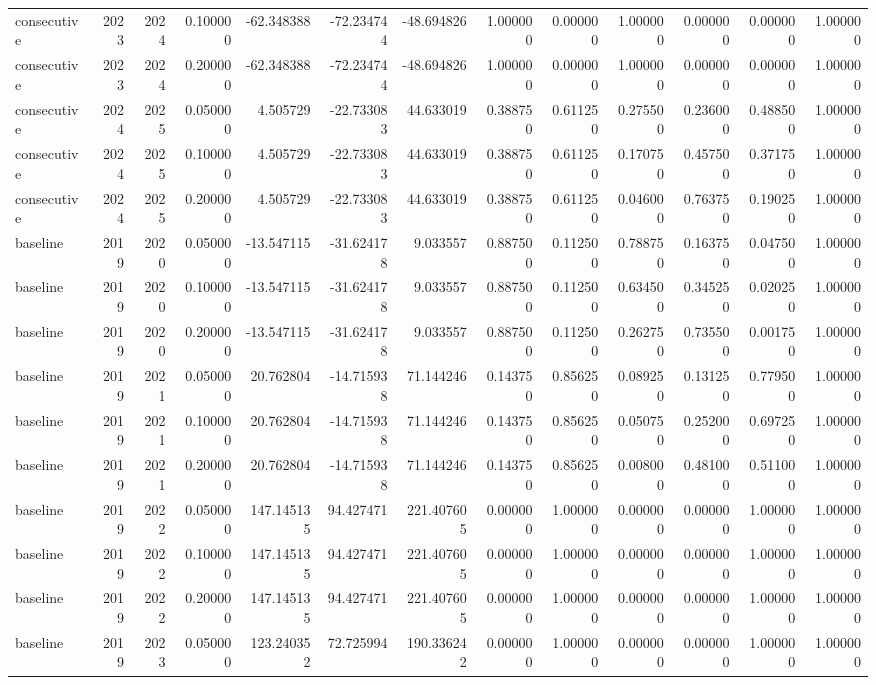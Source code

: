 \begin{tabular}{lrrrrrrrrrrrr}
consecutive & 2023 & 2024 & 0.100000 & -62.348388 & -72.234744 & -48.694826 & 1.000000 & 0.000000 & 1.000000 & 0.000000 & 0.000000 & 1.000000 \\
consecutive & 2023 & 2024 & 0.200000 & -62.348388 & -72.234744 & -48.694826 & 1.000000 & 0.000000 & 1.000000 & 0.000000 & 0.000000 & 1.000000 \\
consecutive & 2024 & 2025 & 0.050000 & 4.505729 & -22.733083 & 44.633019 & 0.388750 & 0.611250 & 0.275500 & 0.236000 & 0.488500 & 1.000000 \\
consecutive & 2024 & 2025 & 0.100000 & 4.505729 & -22.733083 & 44.633019 & 0.388750 & 0.611250 & 0.170750 & 0.457500 & 0.371750 & 1.000000 \\
consecutive & 2024 & 2025 & 0.200000 & 4.505729 & -22.733083 & 44.633019 & 0.388750 & 0.611250 & 0.046000 & 0.763750 & 0.190250 & 1.000000 \\
baseline & 2019 & 2020 & 0.050000 & -13.547115 & -31.624178 & 9.033557 & 0.887500 & 0.112500 & 0.788750 & 0.163750 & 0.047500 & 1.000000 \\
baseline & 2019 & 2020 & 0.100000 & -13.547115 & -31.624178 & 9.033557 & 0.887500 & 0.112500 & 0.634500 & 0.345250 & 0.020250 & 1.000000 \\
baseline & 2019 & 2020 & 0.200000 & -13.547115 & -31.624178 & 9.033557 & 0.887500 & 0.112500 & 0.262750 & 0.735500 & 0.001750 & 1.000000 \\
baseline & 2019 & 2021 & 0.050000 & 20.762804 & -14.715938 & 71.144246 & 0.143750 & 0.856250 & 0.089250 & 0.131250 & 0.779500 & 1.000000 \\
baseline & 2019 & 2021 & 0.100000 & 20.762804 & -14.715938 & 71.144246 & 0.143750 & 0.856250 & 0.050750 & 0.252000 & 0.697250 & 1.000000 \\
baseline & 2019 & 2021 & 0.200000 & 20.762804 & -14.715938 & 71.144246 & 0.143750 & 0.856250 & 0.008000 & 0.481000 & 0.511000 & 1.000000 \\
baseline & 2019 & 2022 & 0.050000 & 147.145135 & 94.427471 & 221.407605 & 0.000000 & 1.000000 & 0.000000 & 0.000000 & 1.000000 & 1.000000 \\
baseline & 2019 & 2022 & 0.100000 & 147.145135 & 94.427471 & 221.407605 & 0.000000 & 1.000000 & 0.000000 & 0.000000 & 1.000000 & 1.000000 \\
baseline & 2019 & 2022 & 0.200000 & 147.145135 & 94.427471 & 221.407605 & 0.000000 & 1.000000 & 0.000000 & 0.000000 & 1.000000 & 1.000000 \\
baseline & 2019 & 2023 & 0.050000 & 123.240352 & 72.725994 & 190.336242 & 0.000000 & 1.000000 & 0.000000 & 0.000000 & 1.000000 & 1.000000 \\

\end{tabular}

